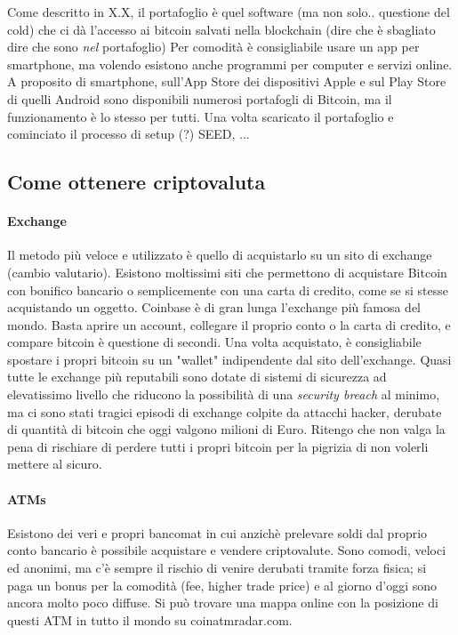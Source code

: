 \documentclass {article}
\begin{document}
Come descritto in X.X, il portafoglio è quel software (ma non solo.. questione del cold) che ci dà l'accesso ai bitcoin salvati nella blockchain (dire che è sbagliato dire che sono \emph{nel} portafoglio)
Per comodità è consigliabile usare un app per smartphone, ma volendo esistono anche programmi per computer e servizi online.
A proposito di smartphone, sull'App Store dei dispositivi Apple e sul Play Store di quelli Android sono disponibili numerosi portafogli di Bitcoin, ma il funzionamento è lo stesso per tutti.
Una volta scaricato il portafoglio e cominciato il processo di setup (?) SEED, ...


\subsection {Come ottenere criptovaluta}


\paragraph {Exchange}


Il metodo più veloce e utilizzato è quello di acquistarlo su un sito di exchange (cambio valutario). Esistono moltissimi siti che permettono di acquistare Bitcoin con bonifico bancario o semplicemente con una carta di credito, come se si stesse acquistando un oggetto.
Coinbase è di gran lunga l'exchange più famosa del mondo.
Basta aprire un account, collegare il proprio conto o la carta di credito, e compare bitcoin è questione di secondi.
Una volta acquistato, è consigliabile spostare i propri bitcoin su un "wallet" indipendente dal sito dell'exchange.
Quasi tutte le exchange più reputabili sono dotate di sistemi di sicurezza ad elevatissimo livello che riducono la possibilità di una \textit{security breach} al minimo, ma ci sono stati tragici episodi di exchange colpite da attacchi hacker, derubate di quantità di bitcoin che oggi valgono milioni di Euro.
Ritengo che non valga la pena di rischiare di perdere tutti i propri bitcoin per la pigrizia di non volerli mettere al sicuro.


\paragraph {ATMs}


Esistono dei veri e propri bancomat in cui anzichè prelevare soldi dal proprio conto bancario è possibile acquistare e vendere criptovalute.
Sono comodi, veloci ed anonimi, ma c'è sempre il rischio di venire derubati tramite forza fisica; si paga un bonus per la comodità (fee, higher trade price) e al giorno d'oggi sono ancora molto poco diffuse.
Si può trovare una mappa online con la posizione di questi ATM in tutto il mondo su coinatmradar.com.
\end{document}
